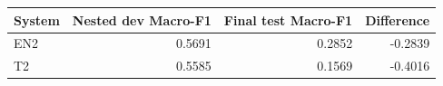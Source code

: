 \begin{tabular}{lrrr}
\toprule
System & Nested dev Macro-F1 & Final test Macro-F1 & Difference \\
\midrule
EN2 & 0.5691 & 0.2852 & -0.2839 \\
T2 & 0.5585 & 0.1569 & -0.4016 \\
\bottomrule
\end{tabular}
